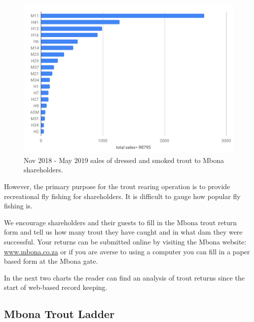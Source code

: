 \begin{figure}[H]
  \centering
  \includegraphics[scale = 0.75]{tables/MbonaTroutShareholderSales.pdf}
   \caption{Nov 2018 - May 2019 sales of dressed and smoked trout to Mbona shareholders.}
  \label{fig:ShareholderSales}
\end{figure}

However, the primary purpose for the trout rearing operation is to provide recreational
fly fishing for shareholders. It is difficult to gauge how popular fly fishing is. 

We encourage shareholders
and their guests to fill in the Mbona trout return form and tell us how many trout they have
caught and in what dam they were successful. Your returns can be submitted online
by visiting the Mbona website: \url{www.mbona.co.za} or if you are averse to using a
computer you can fill in a paper based form at the Mbona gate.

In the next two charts the reader can find an analysis of trout returns since the start of
web-based record keeping.

\subsection{Mbona Trout Ladder}

